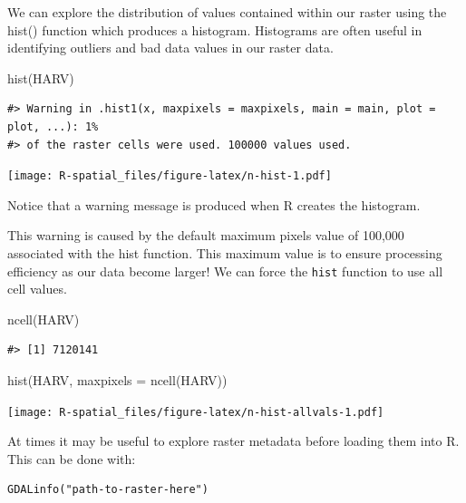 \documentclass[
  11pt,
]{book}
\newenvironment{Shaded}{\begin{snugshade}}{\end{snugshade}}
\newcommand{\AttributeTok}[1]{\textcolor[rgb]{0.77,0.63,0.00}{#1}}
\newcommand{\FunctionTok}[1]{\textcolor[rgb]{0.00,0.00,0.00}{#1}}
\newcommand{\NormalTok}[1]{#1}
\begin{document}
We can explore the distribution of values contained within our raster using the hist() function which produces a histogram. Histograms are often useful in identifying outliers and bad data values in our raster data.

\begin{Shaded}
\begin{Highlighting}[]
\FunctionTok{hist}\NormalTok{(HARV)}
\end{Highlighting}
\end{Shaded}

\begin{verbatim}
#> Warning in .hist1(x, maxpixels = maxpixels, main = main, plot = plot, ...): 1%
#> of the raster cells were used. 100000 values used.
\end{verbatim}

\texttt{[image: R-spatial\_files/figure-latex/n-hist-1.pdf]}

Notice that a warning message is produced when R creates the histogram.

This warning is caused by the default maximum pixels value of 100,000 associated with the hist function. This maximum value is to ensure processing efficiency as our data become larger! We can force the \texttt{hist} function to use all cell values.

\begin{Shaded}
\begin{Highlighting}[]
\FunctionTok{ncell}\NormalTok{(HARV)}
\end{Highlighting}
\end{Shaded}

\begin{verbatim}
#> [1] 7120141
\end{verbatim}

\begin{Shaded}
\begin{Highlighting}[]
\FunctionTok{hist}\NormalTok{(HARV, }\AttributeTok{maxpixels =} \FunctionTok{ncell}\NormalTok{(HARV))}
\end{Highlighting}
\end{Shaded}

\texttt{[image: R-spatial\_files/figure-latex/n-hist-allvals-1.pdf]}

At times it may be useful to explore raster metadata before loading them into R. This can be done with:

\begin{verbatim}
GDALinfo("path-to-raster-here") 
\end{verbatim}
\end{document}
